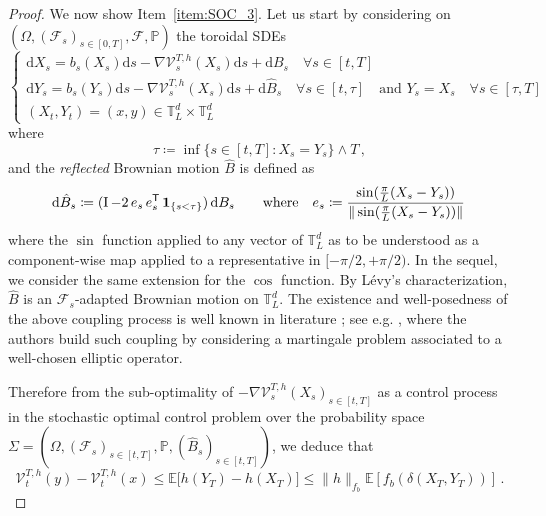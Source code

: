 \documentclass[final,12pt]{colt2023} %
\newcommand{\bes}{\begin{equation}}
\newcommand{\ees}{\end{equation}}
\newcommand{\De}{\mathrm{d}}
\def\torus{\tset}
\def\torusL{\torus_L}
\def\tset{\mathbb{T}}
\begin{document}
\begin{proof}
\medskip

We now show Item~\ref{item:SOC_3}. Let us start by considering on $(\Omega, (\mathcal{F}_s)_{s\in[0,T]},\mathcal{F}, \mathbb{P})$ the toroidal SDEs
\begin{equation}\label{sde:system}
\begin{cases}
\De X_s=b_s(X_s)\De s-\nabla \mathcal{V}^{T,h}_s(X_s)\De s+\De B_s\quad\forall s\in[t,T] \\
\De Y_s=b_s(Y_s)\De s-\nabla \mathcal{V}^{T,h}_s(X_s)\De s+\De \hat{B}_s\quad\forall s\in[t,\tau]\quad\text{and }Y_s=X_s\quad\forall s\in[\tau,T]\\
(X_t,Y_t)=(x,y)\in\mathbb{T}_L^d\times\mathbb{T}_L^d
\end{cases}
\end{equation}
where 
\bes
\tau\coloneqq \inf\{s\in[t,T]:X_s=Y_s\}\wedge T\,,
\ees
and the \emph{reflected} Brownian motion $\hat{B}$ is defined as
\begin{equation}\label{def:refl:brownian}
\De \hat{B}_s\coloneqq (\operatorname{I}-2\,e_s\,e_s^{{\sf  T}}\,\mathbf{1}_{\{s< \tau\}})\, \De B_s\qquad\text{where}\quad e_s\coloneqq \frac{\sin(\frac{\pi}{L}(X_s-Y_s))}{\|\sin(\frac{\pi}{L}(X_s-Y_s))\|}\,
\end{equation}
where the $\sin$ function applied to any vector of $\torusL^d$ as to be understood as a component-wise map applied to a representative in $[-\pi/2,+\pi/2)$. In the sequel, we consider the same extension for the $\cos$ function. 
By L\'evy's characterization, $\hat{B}$ is an $\mathcal{F}_s$-adapted Brownian motion on $\mathbb{T}_L^d$. The existence and well-posedness of the above coupling process is well known in literature ; see e.g. \cite{chen1989coupling}, where the authors build such coupling by considering a martingale problem associated to a well-chosen elliptic operator.

Therefore from the sub-optimality of $-\nabla \mathcal{V}^{T,h}_s(X_s)_{s\in[t,T]}$ as a control process in the stochastic optimal control problem over the probability space $\Sigma=(\Omega,(\mathcal{F}_s)_{s\in[t,T]},\mathbb{P},(\hat{B}_s)_{s\in[t,T]})$, we deduce that
\bes
\label{eq:proof_hjb_1}
 \mathcal{V}^{T,h}_t(y)-\mathcal{V}^{T,h}_t(x)\leq
 \mathbb{E}\biggl[h(Y_T)-h(X_T)\biggr]\leq \|h\|_{f_b} \mathbb{E}[f_b(\delta(X_T,Y_T))]\,.
 \ees


\end{proof}
\end{document}
